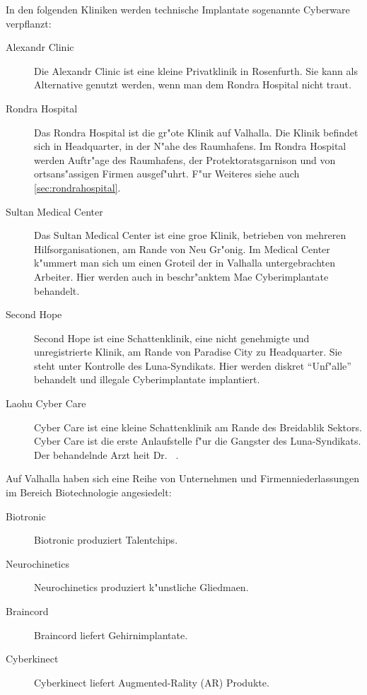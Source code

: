 
In den folgenden Kliniken werden technische Implantate sogenannte Cyberware verpflanzt:

\begin{description}
    \item [Alexandr Clinic] Die Alexandr Clinic ist eine kleine Privatklinik in Rosenfurth. Sie kann als Alternative genutzt werden, wenn 
        man dem Rondra Hospital nicht traut.
    \item [Rondra Hospital] Das Rondra Hospital ist die gr"o\3te Klinik auf Valhalla. Die Klinik befindet sich in Headquarter, in der N"ahe 
        des Raumhafens. Im Rondra Hospital werden Auftr"age des Raumhafens, der Protektoratsgarnison und von ortsans"assigen Firmen ausgef"uhrt. F"ur Weiteres siehe auch \cref{sec:rondrahospital}. 
    \item [Sultan Medical Center] Das Sultan Medical Center ist eine gro\3e Klinik, betrieben von mehreren Hilfsorganisationen, am Rande 
        von Neu Gr"onig. Im Medical Center k"ummert man sich um einen Gro\3teil der in Valhalla untergebrachten Arbeiter. Hier werden auch in beschr"anktem Ma\3e Cyberimplantate behandelt.
    \item [Second Hope] Second Hope ist eine Schattenklinik, eine nicht genehmigte und unregistrierte Klinik, am Rande von Paradise City zu 
        Headquarter. Sie steht unter Kontrolle des Luna-Syndikats. Hier werden diskret ``Unf"alle'' behandelt und illegale Cyberimplantate implantiert.
    \item [Laohu Cyber Care]  Cyber Care ist eine kleine Schattenklinik am Rande des Breidablik Sektors. Cyber 
        Care ist die erste Anlaufstelle f"ur die Gangster des Luna-Syndikats. Der behandelnde Arzt hei\3t Dr.~ .
\end{description}


Auf Valhalla haben sich eine Reihe von Unternehmen und Firmenniederlassungen im Bereich Biotechnologie angesiedelt:

\begin{description}
    \item [Biotronic] Biotronic produziert Talentchips.
    \item [Neurochinetics] Neurochinetics produziert k"unstliche Gliedma\3en.
    \item [Braincord]  Braincord liefert Gehirnimplantate.
    \item [Cyberkinect] Cyberkinect liefert Augmented-Rality (AR) Produkte.
\end{description}


